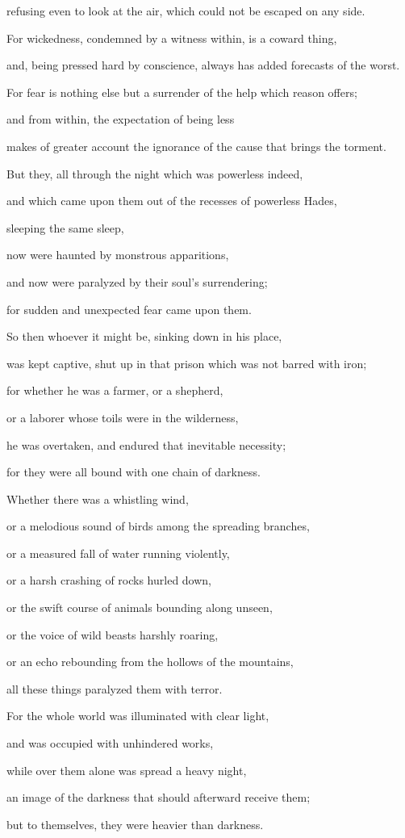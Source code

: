 {\par }{\QB refusing even to look at the air, which could not be escaped on any side.
\par }{\Q {}For wickedness, condemned by a witness within, is a coward thing,
\par }{\QB and, being pressed hard by conscience, always has added forecasts of the worst.
\par }{\QB {}For fear is nothing else but a surrender of the help which reason offers;
\par }{\QB {}and from within, the expectation of being less
\par }{\QB makes of greater account the ignorance of the cause that brings the torment.
\par }{\Q {}But they, all through the night which was powerless indeed,
\par }{\QB and which came upon them out of the recesses of powerless Hades,
\par }{\QB sleeping the same sleep,
\par }{\QB {}now were haunted by monstrous apparitions,
\par }{\QB and now were paralyzed by their soul’s surrendering;
\par }{\QB for sudden and unexpected fear came upon them.
\par }{\Q {}So then whoever it might be, sinking down in his place,
\par }{\QB was kept captive, shut up in that prison which was not barred with iron;
\par }{\Q {}for whether he was a farmer, or a shepherd,
\par }{\QB or a laborer whose toils were in the wilderness,
\par }{\QB he was overtaken, and endured that inevitable necessity;
\par }{\QB for they were all bound with one chain of darkness.
\par }{\Q {}Whether there was a whistling wind,
\par }{\QB or a melodious sound of birds among the spreading branches,
\par }{\QB or a measured fall of water running violently,
\par }{\QB {}or a harsh crashing of rocks hurled down,
\par }{\QB or the swift course of animals bounding along unseen,
\par }{\QB or the voice of wild beasts harshly roaring,
\par }{\QB or an echo rebounding from the hollows of the mountains,
\par }{\QB all these things paralyzed them with terror.
\par }{\Q {}For the whole world was illuminated with clear light,
\par }{\QB and was occupied with unhindered works,
\par }{\QB {}while over them alone was spread a heavy night,
\par }{\QB an image of the darkness that should afterward receive them;
\par }{\QB but to themselves, they were heavier than darkness.

}
